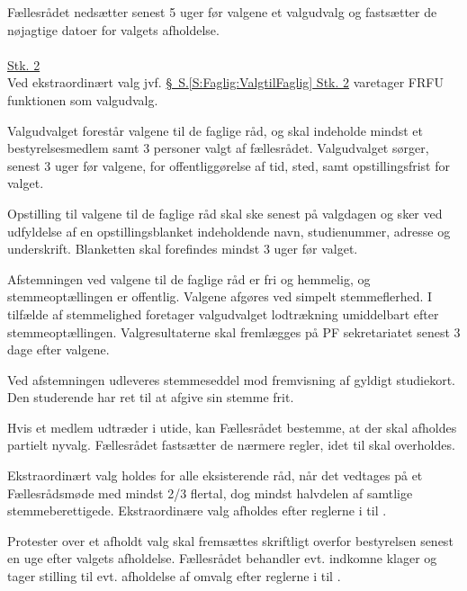 \begin{list}
\begin{list}
\item \label{S:Faglig:Valgudvalg} Fællesrådet nedsætter senest 5 uger før valgene et valgudvalg og fastsætter de nøjagtige datoer for valgets afholdelse.\\
\\
\underline{Stk. 2}\\
Ved ekstraordinært valg jvf. \hyperref[S:Faglig:ValgtilFaglig]{\S \ S.\ref*{S:Faglig:ValgtilFaglig} Stk. 2} varetager FRFU funktionen som valgudvalg.\\

\item Valgudvalget forestår valgene til de faglige råd, og skal indeholde mindst et bestyrelsesmedlem samt 3 personer valgt af fællesrådet. Valgudvalget sørger, senest 3 uger før valgene, for offentliggørelse af tid, sted, samt opstillingsfrist for valget.

\item \label{S:Faglig:Blanket} Opstilling til valgene til de faglige råd skal ske senest på valgdagen og sker ved udfyldelse af en opstillingsblanket indeholdende navn, studienummer, adresse og underskrift. Blanketten skal forefindes mindst 3 uger før valget.

\item Afstemningen ved valgene til de faglige råd er fri og hemmelig, og stemmeoptællingen er offentlig. Valgene afgøres ved simpelt stemmeflerhed. I tilfælde af stemmelighed foretager valgudvalget lodtrækning umiddelbart efter stemmeoptællingen. Valgresultaterne skal fremlægges på PF sekretariatet senest 3 dage efter valgene.
\item Ved afstemningen udleveres stemmeseddel mod fremvisning af gyldigt studiekort. Den studerende har ret til at afgive sin stemme frit.

\item Hvis et medlem udtræder i utide, kan Fællesrådet bestemme, at der skal afholdes partielt nyvalg. Fællesrådet fastsætter de nærmere regler, idet  til  skal overholdes.\\

\item Ekstraordinært valg holdes for alle eksisterende råd, når det vedtages på et Fællesrådsmøde med mindst 2/3 flertal, dog mindst halvdelen af samtlige stemmeberettigede. Ekstraordinære valg afholdes efter reglerne i  til .

\item Protester over et afholdt valg skal fremsættes skriftligt overfor bestyrelsen senest en uge efter valgets afholdelse. Fællesrådet behandler evt. indkomne klager og tager stilling til evt. afholdelse af omvalg efter reglerne i  til .



\end{list}
\end{list}
